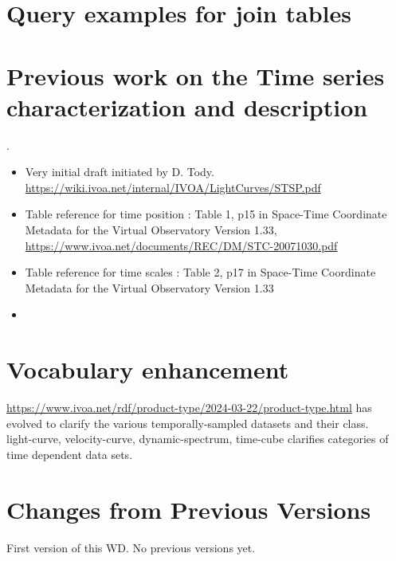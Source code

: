 \documentclass[11pt,a4paper]{ivoa}
\begin{document}



\appendix



\section{Query examples for join tables}\label{sec:query_examples}

\section{Previous work on the Time series characterization and description}.

\begin{itemize}
\item Very initial draft initiated by D. Tody. \url{https://wiki.ivoa.net/internal/IVOA/LightCurves/STSP.pdf}
\item Table reference for time position : Table 1, p15 in Space-Time Coordinate Metadata for the Virtual Observatory
Version 1.33, \url{https://www.ivoa.net/documents/REC/DM/STC-20071030.pdf}
\item Table reference for time scales :  Table 2, p17 in Space-Time Coordinate Metadata for the Virtual Observatory
Version 1.33
\item
\end{itemize}

\section{Vocabulary enhancement}
 \url{https://www.ivoa.net/rdf/product-type/2024-03-22/product-type.html}
has evolved to clarify the various temporally-sampled datasets and their class.\\
light-curve, velocity-curve, dynamic-spectrum, time-cube clarifies categories of time dependent data sets.

\section{Changes from Previous Versions}

First version of this WD.
No previous versions yet.
\end{document}
